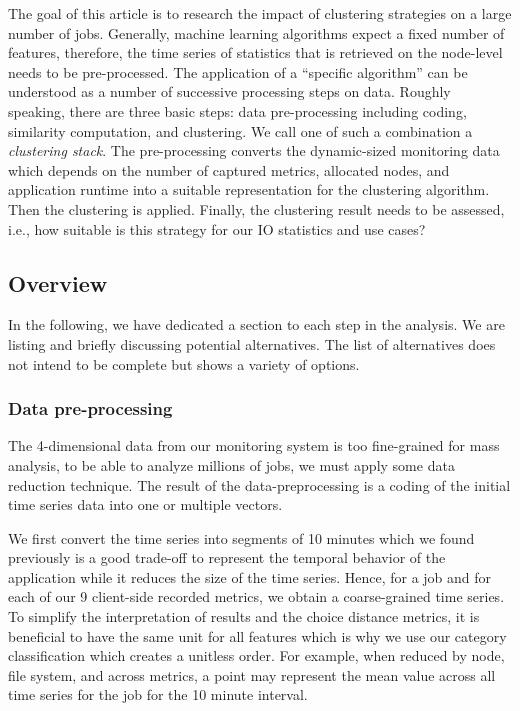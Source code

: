 \documentclass{jhps}
\begin{document}
The goal of this article is to research the impact of clustering strategies on a large number of jobs.
Generally, machine learning algorithms expect a fixed number of features, therefore, the time series of statistics that is retrieved on the node-level needs to be pre-processed.
The application of a “specific algorithm” can be understood as a number of successive processing steps on data.
Roughly speaking, there are three basic steps: data pre-processing including coding, similarity computation, and clustering.
We call one of such a combination a \textit{clustering stack}.
The pre-processing converts the dynamic-sized monitoring data which depends on the number of captured metrics, allocated nodes, and application runtime into a suitable representation for the clustering algorithm.
Then the clustering is applied.
Finally, the clustering result needs to be assessed, i.e., how suitable is this strategy for our IO statistics and use cases?

\subsection{Overview}

In the following, we have dedicated a section to each step in the analysis.
We are listing and briefly discussing potential alternatives.
The list of alternatives does not intend to be complete but shows a variety of options.

\subsubsection{Data pre-processing}
The 4-dimensional data from our monitoring system is too fine-grained for mass analysis,
to be able to analyze millions of jobs, we must apply some data reduction technique.
The result of the data-preprocessing is a coding of the initial time series data into one or multiple vectors.

We first convert the time series into segments of 10 minutes which we found previously is a good trade-off to represent the temporal behavior of the application while it reduces the size of the time series.
Hence, for a job and for each of our 9 client-side recorded metrics, we obtain a coarse-grained time series.
To simplify the interpretation of results and the choice distance metrics, it is beneficial to have the same unit for all features which is why we use our category classification which creates a unitless order.
For example, when reduced by node, file system, and across metrics, a point may represent the mean value across all time series for the job for the 10 minute interval.
\end{document}
